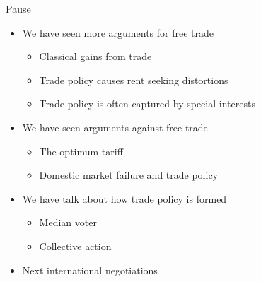 \documentclass{beamer}
\begin{document}

\begin{frame}{Pause}
    \begin{itemize}
        \item We have seen more arguments for free trade
        \begin{itemize}
            \item Classical gains from trade
            \item Trade policy causes rent seeking distortions
            \item Trade policy is often captured by special interests
        \end{itemize}
        \item We have seen arguments against free trade
        \begin{itemize}
            \item The optimum tariff
            \item Domestic market failure and trade policy
        \end{itemize}
        \item We have talk about how trade policy is formed
        \begin{itemize}
            \item Median voter
            \item Collective action
        \end{itemize}
        \item Next international negotiations
    \end{itemize}
\end{frame}
\end{document}
